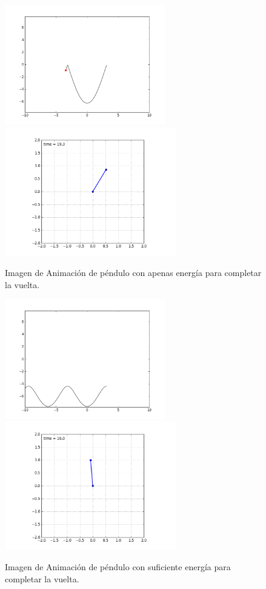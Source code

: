 \documentclass[12pt]{article}
\begin{document}
\begin{figure}[H]
\centering
\includegraphics[width=7cm]{FaseFull2.png}
\includegraphics[width=7.5cm]{PenduloFull2.png}
\caption{Imagen de Animación de péndulo con apenas energía para completar la vuelta.}
\end{figure}

\begin{figure}[H]
\centering
\includegraphics[width=7cm]{FaseFull1.png}
\includegraphics[width=7.5cm]{PenduloFull1.png}
\caption{Imagen de Animación de péndulo con suficiente energía para completar la vuelta.}
\end{figure}
\end{document}

